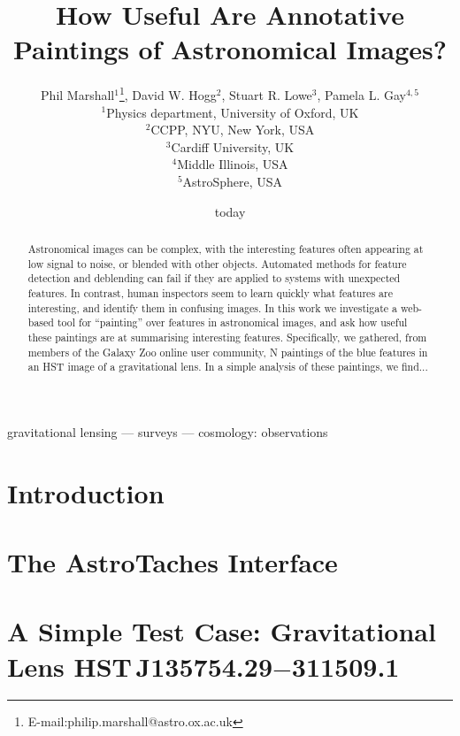 \documentclass[useAMS,usenatbib]{mn2e}
\title%
[Astronomical Image Annotation]%
{How Useful Are Annotative Paintings of Astronomical Images?}
\author%
[Marshall et al]%
{Phil Marshall$^{1}$\thanks{E-mail:philip.marshall@astro.ox.ac.uk}, 
David W. Hogg$^{2}$,
Stuart R. Lowe$^{3}$,
Pamela L. Gay$^{4,5}$\\
$^{1}$Physics department, University of Oxford, UK\\
$^{2}$CCPP, NYU, New York, USA\\
$^{3}$Cardiff University, UK\\
$^{4}$Middle Illinois, USA\\
$^{5}$AstroSphere, USA}
\date{today}
\def\lens{HST\,J135754.29$-$311509.1}
\begin{document}
\maketitle


\begin{abstract}

Astronomical images can be complex, with the interesting features often
appearing at low signal to noise, or blended with other objects. Automated
methods for feature detection and deblending can fail if they are applied to
systems with unexpected features. In contrast,  human inspectors seem to learn
quickly what features are interesting, and identify them in confusing images.
In this work we investigate a web-based tool for ``painting'' over features in
astronomical images, and ask how useful these paintings are at summarising
interesting features. Specifically, we gathered, from members of the Galaxy
Zoo online user community, N paintings of the blue features in an HST image of
a gravitational lens. In a simple analysis of these paintings, we find...

\end{abstract}


\begin{keywords}
gravitational lensing --- surveys --- cosmology: observations
\end{keywords}



\section{Introduction}



\section{The AstroTaches Interface}
\label{sect:interface}




\section{A Simple Test Case: Gravitational Lens \lens}
\label{sect:testcase}
\end{document}

